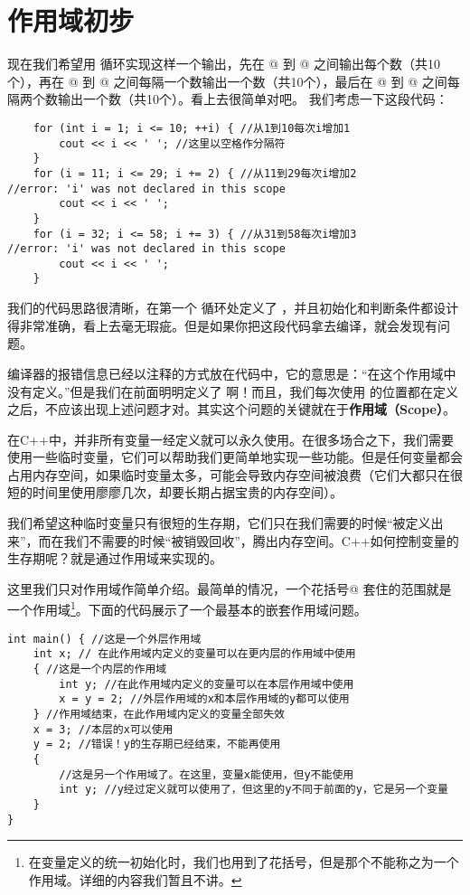 \section{作用域初步}
现在我们希望用 \lstinline@for@ 循环实现这样一个输出，先在 @ 到 @ 之间输出每个数（共10个），再在 @ 到 @ 之间每隔一个数输出一个数（共10个），最后在 @ 到 @ 之间每隔两个数输出一个数（共10个）。看上去很简单对吧。
我们考虑一下这段代码：
\begin{lstlisting}
    for (int i = 1; i <= 10; ++i) { //从1到10每次i增加1
    	cout << i << ' '; //这里以空格作分隔符
    }
    for (i = 11; i <= 29; i += 2) { //从11到29每次i增加2
//error: 'i' was not declared in this scope
    	cout << i << ' ';
    }
    for (i = 32; i <= 58; i += 3) { //从31到58每次i增加3
//error: 'i' was not declared in this scope
    	cout << i << ' ';
    }
\end{lstlisting}
我们的代码思路很清晰，在第一个 \lstinline@for@ 循环处定义了 \lstinline@i@，并且初始化和判断条件都设计得非常准确，看上去毫无瑕疵。但是如果你把这段代码拿去编译，就会发现有问题。\par
编译器的报错信息已经以注释的方式放在代码中，它的意思是：``\lstinline@i@ 在这个作用域中没有定义。''但是我们在前面明明定义了 \lstinline@i@ 啊！而且，我们每次使用 \lstinline@i@ 的位置都在定义之后，不应该出现上述问题才对。其实这个问题的关键就在于\textbf{作用域（Scope）}。\par
在C++中，并非所有变量一经定义就可以永久使用。在很多场合之下，我们需要使用一些临时变量，它们可以帮助我们更简单地实现一些功能。但是任何变量都会占用内存空间，如果临时变量太多，可能会导致内存空间被浪费（它们大都只在很短的时间里使用廖廖几次，却要长期占据宝贵的内存空间）。\par
我们希望这种临时变量只有很短的生存期，它们只在我们需要的时候``被定义出来''，而在我们不需要的时候``被销毁回收''，腾出内存空间。C++如何控制变量的生存期呢？就是通过作用域来实现的。\par
这里我们只对作用域作简单介绍。最简单的情况，一个花括号\lstinline@{}@ 套住的范围就是一个作用域\footnote{在变量定义的统一初始化时，我们也用到了花括号，但是那个不能称之为一个作用域。详细的内容我们暂且不讲。}。下面的代码展示了一个最基本的嵌套作用域问题。
\begin{lstlisting}
int main() { //这是一个外层作用域
    int x; // 在此作用域内定义的变量可以在更内层的作用域中使用
    { //这是一个内层的作用域
        int y; //在此作用域内定义的变量可以在本层作用域中使用
        x = y = 2; //外层作用域的x和本层作用域的y都可以使用
    } //作用域结束，在此作用域内定义的变量全部失效
    x = 3; //本层的x可以使用
    y = 2; //错误！y的生存期已经结束，不能再使用
    {
        //这是另一个作用域了。在这里，变量x能使用，但y不能使用
        int y; //y经过定义就可以使用了，但这里的y不同于前面的y，它是另一个变量
    }
}
\end{lstlisting}\par
